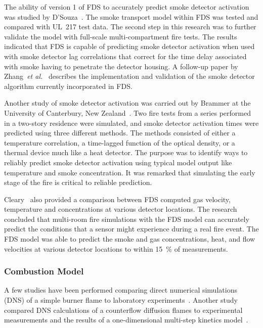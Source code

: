 The ability of  version 1 of FDS to  accurately predict smoke detector activation was studied by D'Souza~\cite{DSouza:1}. The smoke transport model
within FDS  was tested and compared with UL~217 test data.  The second step  in this research was  to further validate  the model with full-scale
multi-compartment fire tests.  The results  indicated that FDS is capable of predicting  smoke detector activation when used with smoke  detector
lag correlations  that  correct  for  the time  delay associated with smoke having to penetrate the detector housing. A follow-up paper by
Zhang~{\em et al.}~\cite{Zhang:FSJ2008} describes the implementation and validation of the smoke detector algorithm currently incorporated in FDS.

Another study of smoke detector  activation was carried out by Brammer at  the University  of Canterbury,  New  Zealand~\cite{Brammer:1}. Two fire
tests from  a series  performed  in a  two-story residence  were simulated, and  smoke detector  activation times were  predicted using three
different methods. The methods consisted of either a temperature correlation,  a time-lagged  function  of the  optical  density, or  a thermal
device much like a heat detector.  The purpose was to identify ways to reliably predict smoke detector activation using typical model output like
temperature and  smoke concentration. It was remarked that simulating  the  early stage  of  the  fire  is critical  to  reliable prediction.

Cleary~\cite{Cleary:1} also provided a comparison between FDS computed gas  velocity,  temperature  and  concentrations at  various  detector
locations.   The research concluded  that multi-room  fire simulations with the FDS model can accurately predict the conditions that a sensor might
experience during a real fire  event.  The FDS model was able to predict the smoke and gas concentrations, heat, and flow velocities at various
detector locations to within 15~\% of measurements.


\subsubsection{Combustion Model}

A few studies have been performed comparing direct numerical
simulations (DNS) of a simple burner flame to laboratory
experiments~\cite{Mukhopadhyay:1}. Another study compared DNS
calculations of a counterflow diffusion flames to experimental
measurements and the results of a one-dimensional multi-step kinetics
model~\cite{Hamins:NASA}.

